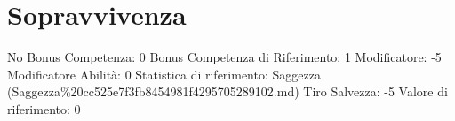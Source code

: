 \section{Sopravvivenza}\label{sopravvivenza}

\begin{description}
\tightlist
\item[Tags: ABI]
No Bonus Competenza: 0 Bonus Competenza di Riferimento: 1 Modificatore:
-5 Modificatore Abilità: 0 Statistica di riferimento: Saggezza
(Saggezza\%20cc525e7f3fb8454981f4295705289102.md) Tiro Salvezza: -5
Valore di riferimento: 0
\end{description}
